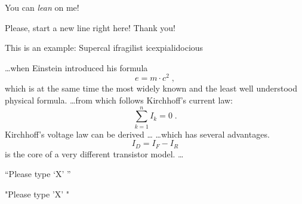 \documentclass[11pt,twoside,a4paper]{article}
\begin{document}
    You can \textsl{lean} on me!

    Please, start a new line
    right here!\newline
    Thank you!

    

    This is an %
    example: Supercal%
    ifragilist%
    icexpialidocious


    \ldots when Einstein introduced his formula
    \begin{equation}
        e = m \cdot c^2 \; ,
    \end{equation}
    which is at the same time the most widely known
    and the least well understood physical formula.
    \ldots from which follows Kirchhoff's current law:
    \begin{equation}
        \sum_{k=1}^{n} I_k = 0 \; .
    \end{equation}
    Kirchhoff's voltage law can be derived \ldots
    \ldots which has several advantages.
    \begin{equation}
        I_D = I_F - I_R
    \end{equation}
    is the core of a very different transistor model. \ldots

    ``Please type `X' ''

    "Please type 'X' "
\end{document}
